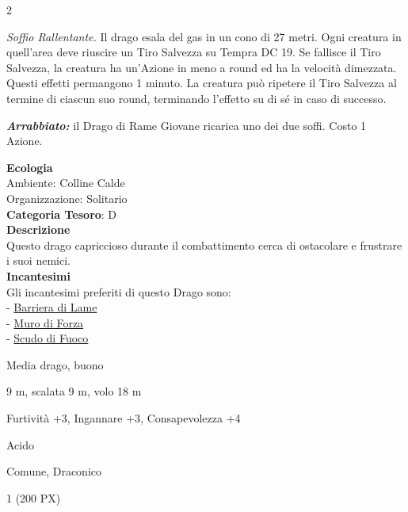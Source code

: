 \begin{multicols}{2}
{\emph{Soffio Rallentante.} Il drago esala del gas in un cono di 27 metri. Ogni creatura in quell'area deve riuscire un Tiro Salvezza su Tempra DC 19. Se fallisce il Tiro Salvezza, la creatura ha un'Azione in meno a round ed ha la velocità dimezzata. Questi effetti permangono 1 minuto. La creatura può ripetere il Tiro Salvezza al termine di ciascun suo round, terminando l'effetto su di sé in caso di successo.

\emph{\textbf{Arrabbiato:}} il Drago di Rame Giovane ricarica uno dei due soffi. Costo 1 Azione.

\textbf{Ecologia}\\
Ambiente: Colline Calde\\
Organizzazione: Solitario\\
\textbf{Categoria Tesoro}: D\\
\textbf{Descrizione}\\
Questo drago capriccioso durante il combattimento cerca di ostacolare e frustrare i suoi nemici.\\
\textbf{Incantesimi}\\
Gli incantesimi preferiti di questo Drago sono:\\
- \hyperlink{Barriera di Lame}{Barriera di Lame}\\
- \hyperlink{Muro di Forza}{Muro di Forza}\\
- \hyperlink{Scudo di Fuoco}{Scudo di Fuoco}

\begin{description}[noitemsep, topsep=0pt, parsep=0pt, partopsep=0pt, itemsep=1pt, leftmargin=2.35cm,  labelwidth=2.2cm, itemindent=0cm, listparindent=0pt] %
\setlength{\baselineskip}{10pt}
\item[\textbf{Taglia/Tipo}] Media drago, buono
\item[\textbf{Caratt.}] 
\item[\textbf{Punti Ferita}] 
\item[\textbf{Movimento}] 9 m, scalata 9 m, volo 18 m
\item[\textbf{Tiri Salvez.}] 
\item[\textbf{Comp.}] Furtività +3, Ingannare +3, Consapevolezza +4
\item[\textbf{Imm. Danni}] Acido
\item[\textbf{Sensi}] 
\item[\textbf{Linguaggi}] Comune, Draconico
\item[\textbf{Sfida}] 1 (200 PX)
\end{description}
\smallskip

}
\end{multicols}
